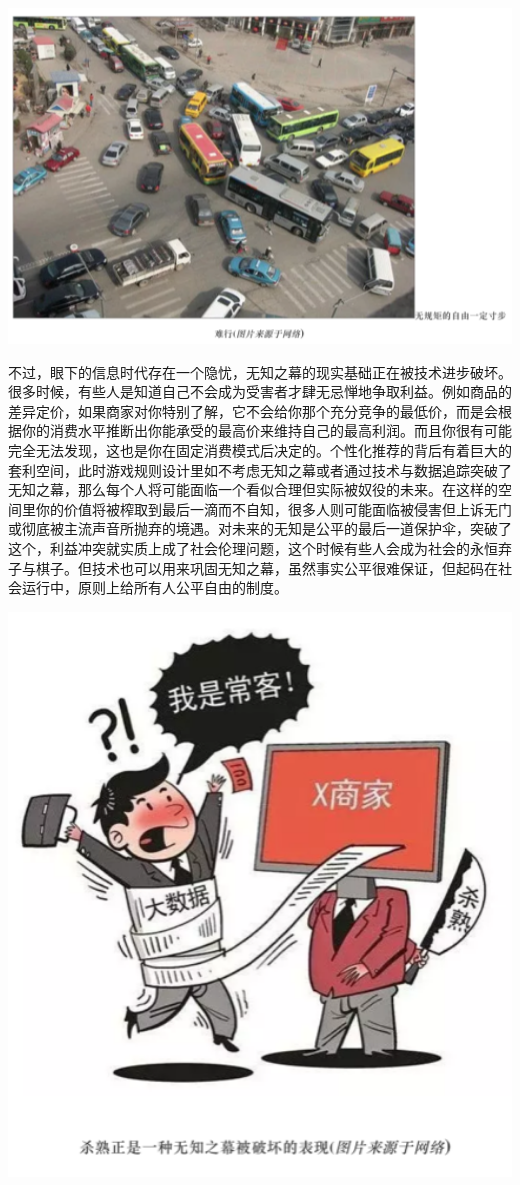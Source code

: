 \documentclass[
]{book}
\begin{document}
\includegraphics[width=6.67in]{images/wuzhi2}

不过，眼下的信息时代存在一个隐忧，无知之幕的现实基础正在被技术进步破坏。很多时候，有些人是知道自己不会成为受害者才肆无忌惮地争取利益。例如商品的差异定价，如果商家对你特别了解，它不会给你那个充分竞争的最低价，而是会根据你的消费水平推断出你能承受的最高价来维持自己的最高利润。而且你很有可能完全无法发现，这也是你在固定消费模式后决定的。个性化推荐的背后有着巨大的套利空间，此时游戏规则设计里如不考虑无知之幕或者通过技术与数据追踪突破了无知之幕，那么每个人将可能面临一个看似合理但实际被奴役的未来。在这样的空间里你的价值将被榨取到最后一滴而不自知，很多人则可能面临被侵害但上诉无门或彻底被主流声音所抛弃的境遇。对未来的无知是公平的最后一道保护伞，突破了这个，利益冲突就实质上成了社会伦理问题，这个时候有些人会成为社会的永恒弃子与棋子。但技术也可以用来巩固无知之幕，虽然事实公平很难保证，但起码在社会运行中，原则上给所有人公平自由的制度。

\includegraphics[width=5.94in]{images/wuzhi3}
\end{document}
